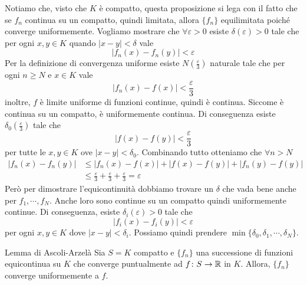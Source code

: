 \documentclass[a4paper]{article}
\begin{document}
\begin{radioactive}
\begin{snippetproof}{}
    Notiamo che, visto che \(K\) è compatto, questa proposizione si lega con il fatto
    che se \(f_n\) continua su un compatto, quindi limitata, allora \(\{f_n\}\)
    equilimitata poiché converge uniformemente. %
    Vogliamo mostrare che \(\forall \varepsilon > 0\)
    esiste \(\delta(\varepsilon) > 0\) tale che
    per ogni \(x,y \in K\) quando \(|x-y|<\delta\) vale
    \[
        |f_n(x)-f_n(y)|<\varepsilon
    \]
    Per la definizione di convergenza uniforme esiste
    \(N\left(\frac{\varepsilon}{3}\right)\)
    naturale tale che
    per ogni \(n \geq N\) e \(x \in K\)
    vale \[
        |f_n(x)-f(x)|<\frac{\varepsilon}{3}
    \]
    inoltre, \(f\) è limite uniforme di funzioni continue,
    quindi è continua.
    Siccome è continua su un compatto, è uniformemente continua.
    Di conseguenza esiste \(\delta_0\left(\frac{\varepsilon}{3}\right)\) tale che
    \[
        |f(x) - f(y)| < \frac{\varepsilon}{3}
    \]
    per tutte le \(x,y \in K\) ove \(|x-y| < \delta_0\).
    Combinando tutto otteniamo che \(\forall n > N\)
    \begin{align*}
        |f_n(x)-f_n(y)| &\leq |f_n(x) - f(x)| + |f(x) - f(y)| + |f_n(y) - f(y)| \\
        &\leq \frac{\varepsilon}{3} + \frac{\varepsilon}{3} + \frac{\varepsilon}{3}
        = \varepsilon
    \end{align*}
    Però per dimostrare l'equicontinuità
    dobbiamo trovare un \(\delta\) che vada bene anche per \(f_1, \cdots, f_{N}\).
    Anche loro sono continue su un compatto quindi uniformemente continue.
    Di conseguenza,
    esiste \(\delta_i(\varepsilon)>0\) tale che
    \[
        |f_i(x)-f_i(y)|<\varepsilon
    \]
    per ogni \(x,y \in K\)
    dove \(|x-y| < \delta_i\).
    Possiamo quindi prendere \(\min\{\delta_0, \delta_1, \cdots, \delta_N\}\).
\end{snippetproof}
\end{radioactive}

\begin{radioactive}
\begin{snippetlemma}{Lemma di Ascoli-Arzelà}
    Sia \(S=K\) compatto e \(\{f_n\}\) una successione di funzioni equicontinua
    su \(K\) che converge puntualmente ad \(f \colon S \to \mathbb{R}\) in \(K\).
    Allora, \(\{f_n\}\) converge uniformemente a \(f\).
\end{snippetlemma}
\end{radioactive}
\end{document}
